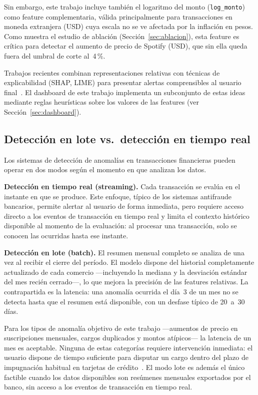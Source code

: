 \documentclass[conference]{IEEEtran}
\begin{document}
Sin embargo, este trabajo incluye tambi\'en el logaritmo del monto (\texttt{log\_monto})
como feature complementaria, v\'alida principalmente para transacciones en moneda
extranjera (USD) cuya escala no se ve afectada por la inflaci\'on en pesos. Como muestra
el estudio de ablaci\'on (Secci\'on~\ref{sec:ablacion}), esta feature es cr\'itica para
detectar el aumento de precio de Spotify (USD), que sin ella queda fuera del umbral de
corte al~4\,\%.

Trabajos recientes combinan representaciones relativas con t\'ecnicas de explicabilidad
(SHAP, LIME) para presentar alertas comprensibles al usuario
final~\cite{lodhi2026explainable, cao2026interpretable}. El dashboard de este trabajo
implementa un subconjunto de estas ideas mediante reglas heur\'isticas sobre los
valores de las features (ver Secci\'on~\ref{sec:dashboard}).

\subsection{Detecci\'on en lote vs.\ detecci\'on en tiempo real}

Los sistemas de detecci\'on de anomal\'ias en transacciones financieras pueden operar
en dos modos seg\'un el momento en que analizan los datos.

\textbf{Detecci\'on en tiempo real (streaming).}  Cada transacci\'on se eval\'ua en
el instante en que se produce. Este enfoque, t\'ipico de los sistemas antifraude
bancarios, permite alertar al usuario de forma inmediata, pero requiere acceso directo
a los eventos de transacci\'on en tiempo real y limita el contexto hist\'orico
disponible al momento de la evaluaci\'on: al procesar una transacci\'on, solo se
conocen las ocurridas hasta ese instante.

\textbf{Detecci\'on en lote (batch).}  El resumen mensual completo se analiza de una
vez al recibir el cierre del per\'iodo. El modelo dispone del historial completamente
actualizado de cada comercio ---incluyendo la mediana y la desviaci\'on est\'andar
del mes reci\'en cerrado---, lo que mejora la precisi\'on de las features relativas.
La contrapartida es la latencia: una anomal\'ia ocurrida el d\'ia~3 de un mes no se
detecta hasta que el resumen est\'a disponible, con un desfase t\'ipico de 20~a~30
d\'ias.

Para los tipos de anomal\'ia objetivo de este trabajo ---aumentos de precio en
suscripciones mensuales, cargos duplicados y montos at\'ipicos--- la latencia de
un mes es aceptable. Ninguna de estas categor\'ias requiere intervenci\'on inmediata:
el usuario dispone de tiempo suficiente para disputar un cargo dentro del plazo de
impugnaci\'on habitual en tarjetas de cr\'edito~\cite{ahmed2016survey}. El modo
lote es adem\'as el \'unico factible cuando los datos disponibles son res\'umenes
mensuales exportados por el banco, sin acceso a los eventos de transacci\'on en
tiempo real.
\end{document}
